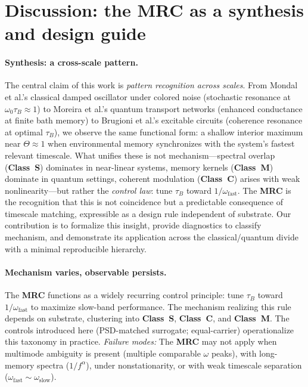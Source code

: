 \documentclass[11pt,letterpaper]{article}
\DeclareRobustCommand{\mrc}{\textbf{MRC}\xspace}
\DeclareRobustCommand{\classS}{\textbf{Class~S}\xspace}
\DeclareRobustCommand{\classC}{\textbf{Class~C}\xspace}
\DeclareRobustCommand{\classM}{\textbf{Class~M}\xspace}
\begin{document}
\clearpage
\section{Discussion: the \mrc as a synthesis and design guide}

\paragraph*{Synthesis: a cross-scale pattern.}
The central claim of this work is \emph{pattern recognition across scales}. From Mondal et al.'s classical damped oscillator under colored noise (stochastic resonance at $\omega_0\tau_B\!\approx\!1$) to Moreira et al.'s quantum transport networks (enhanced conductance at finite bath memory) to Brugioni et al.'s excitable circuits (coherence resonance at optimal $\tau_B$), we observe the same functional form: a shallow interior maximum near $\Theta\!\approx\!1$ when environmental memory synchronizes with the system's fastest relevant timescale. What unifies these is not mechanism---spectral overlap (\classS) dominates in near-linear systems, memory kernels (\classM) dominate in quantum settings, coherent modulation (\classC) arises with weak nonlinearity---but rather the \emph{control law}: tune $\tau_B$ toward $1/\omega_{\mathrm{fast}}$. The \mrc is the recognition that this is not coincidence but a predictable consequence of timescale matching, expressible as a design rule independent of substrate. Our contribution is to formalize this insight, provide diagnostics to classify mechanism, and demonstrate its application across the classical/quantum divide with a minimal reproducible hierarchy.

\paragraph*{Mechanism varies, observable persists.}
The \mrc functions as a widely recurring control principle: tune $\tau_B$ toward $1/\omega_{\mathrm{fast}}$ to maximize slow-band performance. The mechanism realizing this rule depends on substrate, clustering into \classS{}, \classC{}, and \classM{}. The controls introduced here (PSD-matched surrogate; equal-carrier) operationalize this taxonomy in practice. \emph{Failure modes:} The \mrc may not apply when multimode ambiguity is present (multiple comparable $\omega$ peaks), with long-memory spectra ($1/f^\alpha$), under nonstationarity, or with weak timescale separation ($\omega_{\mathrm{fast}}\sim\omega_{\mathrm{slow}}$).
\end{document}
